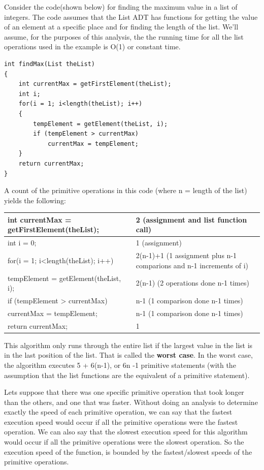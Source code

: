 Consider the code(shown below)  for finding the maximum value in a list of integers.    The code assumes that the List ADT has functions for getting the value of an element at a specific place and for finding the length of the list.   We'll assume, for the purposes of this analysis,  the the running time for all the list operations used in the example is O(1) or constant time.

\begin{lstlisting}
int findMax(List theList)
{
    int currentMax = getFirstElement(theList);
    int i;
    for(i = 1; i<length(theList); i++)
    {
    	tempElement = getElement(theList, i);
        if (tempElement > currentMax)
            currentMax = tempElement;
    }
    return currentMax;
}
\end{lstlisting}

A count of the primitive operations in this code (where n = length of the list) yields the following:

\begin{table}[H]
\begin{tabular}{l || l}
    int currentMax = getFirstElement(theList); & 2 (assignment and list function call)\\ \hline
    int i = 0; & 1 (assignment)\\ \hline
    for(i = 1; i<length(theList); i++) & 2(n-1)+1 (1 assignment plus n-1 comparions and n-1 increments of i)\\ \hline

    	tempElement = getElement(theList, i);  &  2(n-1) (2 operations done n-1 times)\\ \hline
        if (tempElement > currentMax) & n-1 (1 comparison done n-1 times)\\ \hline
            currentMax = tempElement; & n-1 (1 comparison done n-1 times)\\ \hline

   return currentMax; & 1 \\ \hline
\end{tabular}
\end{table}

This algorithm only runs through the entire list if the largest value in the list is in the last position of the list.  That is called the \textbf{worst case}.  In the worst case, the algorithm executes 5 + 6(n-1), or 6n -1  primitive statements (with the assumption that the list functions are the equivalent of a primitive statement).     

Lets suppose that there was one specific primitive operation that took longer than the others, and one that was faster.   Without doing an analysis to determine exactly the speed of each primitive operation,  we can say that the fastest execution speed would occur if all the primitive operations were the fastest operation.   We can also say that the slowest execution speed for this algorithm would occur if all the primitive operations were the slowest operation.    So the execution speed of the function, is bounded by the fastest/slowest speeds of the primitive operations.

